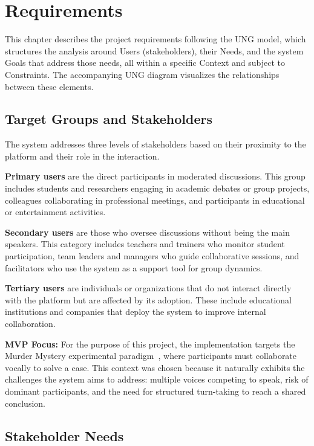 \chapter{Requirements}

This chapter describes the project requirements following the UNG model, which structures the analysis around Users (stakeholders), their Needs, and the system Goals that address those needs, all within a specific Context and subject to Constraints. The accompanying UNG diagram visualizes the relationships between these elements.

\section{Target Groups and Stakeholders}

The system addresses three levels of stakeholders based on their proximity to the platform and their role in the interaction.

\textbf{Primary users} are the direct participants in moderated discussions. This group includes students and researchers engaging in academic debates or group projects, colleagues collaborating in professional meetings, and participants in educational or entertainment activities.

\textbf{Secondary users} are those who oversee discussions without being the main speakers. This category includes teachers and trainers who monitor student participation, team leaders and managers who guide collaborative sessions, and facilitators who use the system as a support tool for group dynamics.

\textbf{Tertiary users} are individuals or organizations that do not interact directly with the platform but are affected by its adoption. These include educational institutions and companies that deploy the system to improve internal collaboration.

\textbf{MVP Focus:} For the purpose of this project, the implementation targets the Murder Mystery experimental paradigm~\cite{Stasser1985PoolingUnshared, Stasser1992HiddenProfiles}, where participants must collaborate vocally to solve a case. This context was chosen because it naturally exhibits the challenges the system aims to address: multiple voices competing to speak, risk of dominant participants, and the need for structured turn-taking to reach a shared conclusion.

\section{Stakeholder Needs}

